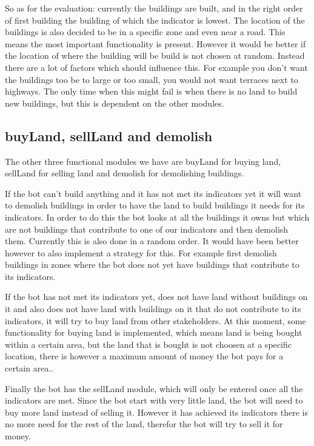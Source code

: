 So as for the evaluation: currently the buildings are built, and in the right order of first building the building of which the indicator is lowest. The location of the buildings is also decided to be in a specific zone and even near a road. This means the most important functionality is present. However it would be better if the location of where the building will be build is not chosen at random. Instead there are a lot of factors which should influence this. For example you don't want the buildings too be to large or too small, you would not want terraces next to highways. The only time when this might fail is when there is no land to build new buildings, but this is dependent on the other modules.

\subsection{buyLand, sellLand and demolish}
The other three functional modules we have are buyLand for buying land, sellLand for selling land and demolish for demolishing buildings. 

If the bot can't build anything and it has not met its indicators yet it will want to demolish buildings in order to have the land to build buildings it needs for its indicators. In order to do this the bot looks at all the buildings it owns but which are not buildings that contribute to one of our indicators and then demolish them. Currently this is also done in a random order. It would have been better however to also implement a strategy for this. For example first demolish buildings in zones where the bot does not yet have buildings that contribute to its indicators. 

If the bot has not met its indicators yet, does not have land without buildings on it and also does not have land with buildings on it that do not contribute to its indicators, it will try to buy land from other stakeholders. At this moment, some functionality for buying land is implemented, which means land is being bought within a certain area, but the land that is bought is not choosen at a specific location, there is however a maximum amount of money the bot pays for a certain area..

Finally the bot has the sellLand module, which will only be entered once all the indicators are met. Since the bot start with very little land, the bot will need to buy more land instead of selling it. However it has achieved its indicators there is no more need for the rest of the land, therefor the bot will try to sell it for money.

